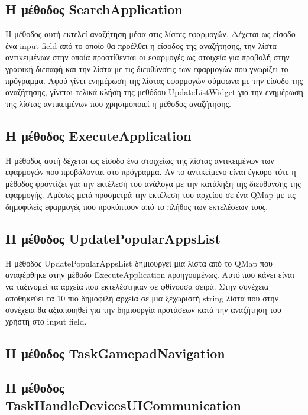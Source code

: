 \subsection{Η μέθοδος SearchApplication}
Η μέθοδος αυτή εκτελεί αναζήτηση μέσα στις λίστες εφαρμογών. Δέχεται ως είσοδο ένα
input field από το οποίο θα προέλθει η είσοδος της αναζήτησης, την λίστα αντικειμένων
στην οποία προστίθενται οι εφαρμογές ως στοιχεία για προβολή στην γραφική διεπαφή και
την λίστα με τις διευθύνσεις των εφαρμογών που γνωρίζει το πρόγραμμα. Αφού γίνει ενημέρωση
της λίστας εφαρμογών σύμφωνα με την είσοδο της αναζήτησης, γίνεται τελικά κλήση της 
μεθόδου UpdateListWidget για την ενημέρωση της λίστας αντικειμένων που χρησιμοποιεί
η μέθοδος αναζήτησης. 


\subsection{Η μέθοδος ExecuteApplication}
Η μέθοδος αυτή δέχεται ως είσοδο ένα στοιχείως της λίστας αντικειμένων των εφαρμογών
που προβάλονται στο πρόγραμμα. Αν το αντικείμενο είναι έγκυρο τότε η μέθοδος φροντίζει
για την εκτέλεσή του ανάλογα με την κατάληξη της διεύθυνσης της εφαρμογής. Αμέσως μετά
προσμετρά την εκτέλεση του αρχείου σε ένα QMap με τις δημοφιλείς εφαρμογές που προκύπτουν
από το πλήθος των εκτελέσεων τους.


\subsection{Η μέθοδος UpdatePopularAppsList}
Η μέθοδος UpdatePopularAppsList δημιουργεί μια λίστα από το QMap που αναφέρθηκε στην
μέθοδο ExecuteApplication προηγουμένως. Αυτό που κάνει είναι να ταξινομεί τα αρχεία που
εκτελέστηκαν σε φθίνουσα σειρά. Στην συνέχεια αποθηκεύει τα 10 πιο δημοφιλή αρχεία σε
μια ξεχωριστή string λίστα που στην συνέχεια θα αξιοποιηθεί για την δημιουργία προτάσεων
κατά την αναζήτηση του χρήστη στο input field.


\subsection{Η μέθοδος TaskGamepadNavigation}



\subsection{Η μέθοδος TaskHandleDevicesUICommunication}



